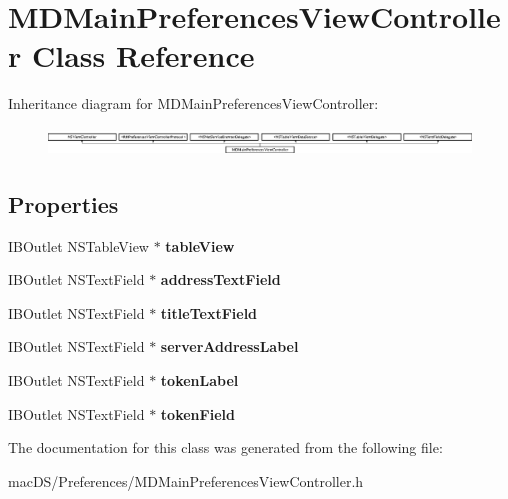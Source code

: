 \hypertarget{interface_m_d_main_preferences_view_controller}{\section{M\-D\-Main\-Preferences\-View\-Controller Class Reference}
\label{interface_m_d_main_preferences_view_controller}
}
Inheritance diagram for M\-D\-Main\-Preferences\-View\-Controller\-:\begin{figure}[H]
\begin{center}
\leavevmode
\includegraphics[height=0.740741cm]{interface_m_d_main_preferences_view_controller}
\end{center}
\end{figure}
\subsection*{Properties}
\begin{DoxyCompactItemize}
\item 
\hypertarget{interface_m_d_main_preferences_view_controller_aa61a9ae962dc2a8d7fd5be8f36c8cf62}{I\-B\-Outlet N\-S\-Table\-View $\ast$ {\bfseries table\-View}}\label{interface_m_d_main_preferences_view_controller_aa61a9ae962dc2a8d7fd5be8f36c8cf62}

\item 
\hypertarget{interface_m_d_main_preferences_view_controller_a9dfae1433203c8ec852648b2da348020}{I\-B\-Outlet N\-S\-Text\-Field $\ast$ {\bfseries address\-Text\-Field}}\label{interface_m_d_main_preferences_view_controller_a9dfae1433203c8ec852648b2da348020}

\item 
\hypertarget{interface_m_d_main_preferences_view_controller_a6f4d01ff12f22736a888a23bd51ad22f}{I\-B\-Outlet N\-S\-Text\-Field $\ast$ {\bfseries title\-Text\-Field}}\label{interface_m_d_main_preferences_view_controller_a6f4d01ff12f22736a888a23bd51ad22f}

\item 
\hypertarget{interface_m_d_main_preferences_view_controller_a44cd3a513344639ec3e1e7e6bc8aed99}{I\-B\-Outlet N\-S\-Text\-Field $\ast$ {\bfseries server\-Address\-Label}}\label{interface_m_d_main_preferences_view_controller_a44cd3a513344639ec3e1e7e6bc8aed99}

\item 
\hypertarget{interface_m_d_main_preferences_view_controller_a598365193d39fd6737dfb0e73a5a01c5}{I\-B\-Outlet N\-S\-Text\-Field $\ast$ {\bfseries token\-Label}}\label{interface_m_d_main_preferences_view_controller_a598365193d39fd6737dfb0e73a5a01c5}

\item 
\hypertarget{interface_m_d_main_preferences_view_controller_a7a49586da4593f1a245e506a493bf1c5}{I\-B\-Outlet N\-S\-Text\-Field $\ast$ {\bfseries token\-Field}}\label{interface_m_d_main_preferences_view_controller_a7a49586da4593f1a245e506a493bf1c5}

\end{DoxyCompactItemize}


The documentation for this class was generated from the following file\-:\begin{DoxyCompactItemize}
\item 
mac\-D\-S/\-Preferences/M\-D\-Main\-Preferences\-View\-Controller.\-h\end{DoxyCompactItemize}
